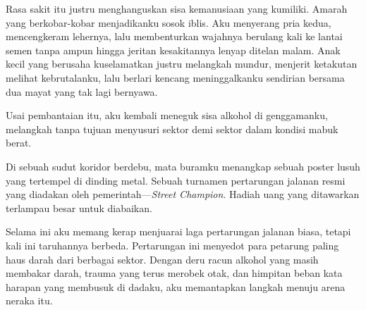 Rasa sakit itu justru menghanguskan sisa kemanusiaan yang kumiliki. Amarah yang berkobar-kobar menjadikanku sosok iblis. Aku menyerang pria kedua, mencengkeram lehernya, lalu membenturkan wajahnya berulang kali ke lantai semen tanpa ampun hingga jeritan kesakitannya lenyap ditelan malam. Anak kecil yang berusaha kuselamatkan justru melangkah mundur, menjerit ketakutan melihat kebrutalanku, lalu berlari kencang meninggalkanku sendirian bersama dua mayat yang tak lagi bernyawa.

Usai pembantaian itu, aku kembali meneguk sisa alkohol di genggamanku, melangkah tanpa tujuan menyusuri sektor demi sektor dalam kondisi mabuk berat.

Di sebuah sudut koridor berdebu, mata buramku menangkap sebuah poster lusuh yang tertempel di dinding metal. Sebuah turnamen pertarungan jalanan resmi yang diadakan oleh pemerintah—\textit{Street Champion}. Hadiah uang yang ditawarkan terlampau besar untuk diabaikan.

Selama ini aku memang kerap menjuarai laga pertarungan jalanan biasa, tetapi kali ini taruhannya berbeda. Pertarungan ini menyedot para petarung paling haus darah dari berbagai sektor. Dengan deru racun alkohol yang masih membakar darah, trauma yang terus merobek otak, dan himpitan beban kata harapan yang membusuk di dadaku, aku memantapkan langkah menuju arena neraka itu.

\jedahias

